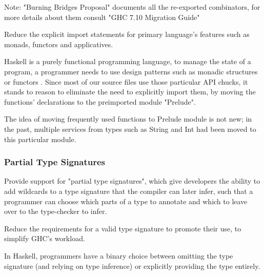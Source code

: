 Note: "Burning Bridges Proposal" documents all the re-exported combinators, for more details about them consult "GHC 7.10 Migration Guide"

\begin{wanted}
Reduce the explicit import statements for primary language's features such as monads, functors and applicatives.
\end{wanted}

\begin{explication}
Haskell is a purely functional programming language, to manage the state of a program, a programmer needs to use design patterns such as monadic structures or functors  \cite{wiki}. Since most of our source files use those particular API chucks, it stands to reason to eliminate the need to explicitly import them, by moving the functions' declarations to the preimported module "Prelude".
\end{explication}

\begin{new}
The idea of moving frequently used functions to Prelude module is not new; in the past, multiple services from types such as String and Int had been moved to this particular module.
\end{new}


\subsubsection{Partial Type Signatures}

\begin{requirement}
Provide support for "partial type signatures", which give developers the ability to add wildcards to a type signature that the compiler can later infer, such that a programmer can choose which parts of a type to annotate and which to leave over to the type-checker to infer.  \cite{wiki}
\end{requirement}

\begin{wanted}
Reduce the requirements for a valid type signature to promote their use, to simplify GHC's workload.
\end{wanted}

\begin{explication}
In Haskell, programmers have a binary choice between omitting the type signature (and relying on type inference) or explicitly providing the type entirely.   \cite{wiki}
\end{explication}

